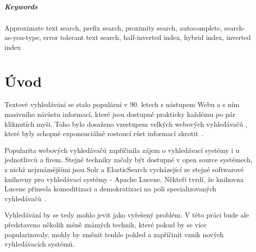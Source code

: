 \documentclass[11pt,letterpaper,oneside,openright]{book}
\begin{document}
\paragraph{Keywords}
Approximate text search, prefix search, proximity search, autocomplete,
search-as-you-type, error tolerant text search, half-inverted index, hybrid
index, inverted index


\newpage
{\hypersetup{hidelinks}
    \tableofcontents
    \listoffigures
    \listoftables
}

\mainmatter
\chapter{Úvod}
Textové vyhledávání se stalo populární v 90. letech s nástupem Webu a s ním
masivního nárůstu informací, které jsou dostupné prakticky každému po pár
kliknutích myši. Toho bylo dosaženo vzestupem velkých webových vyhledávačů ,
které byly schopné exponenciálně rostoucí růst informací
zkrotit~\cite{search_history}.


Popularita webových vyhledávačů zapříčinila zájem o vyhledávací systémy i u
jednotlivců a firem. Stejné techniky začaly být dostupné v open source
systémech, z nichž nejznámějšími jsou Solr a ElasticSearch vycházející ze
stejné softwarové knihovny pro vyhledávací systémy - Apache Lucene. Někteří
tvrdí, že knihovna Lucene přinesla komoditizaci a demokratizaci na poli
specializovaných vyhledávačů~\cite{dion_almaer,javaworld}.

Vyhledávání by se tedy mohlo jevit jako vyřešený problém. V této práci bude ale
představeno několik méně známých technik, které pokud by se více
popularizovaly, mohly by změnit tenhle pohled a zapříčinit vznik nových
vyhledávacích systémů.


\end{document}
